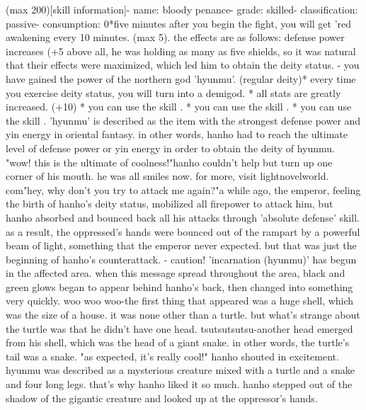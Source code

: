  (max 200)[skill information]- name: bloody penance- grade: skilled- classification: passive- consumption: 0*five minutes after you begin the fight, you will get 'red awakening every 10 minutes.
 (max 5).
 the effects are as follows: defense power increases (+5%
above all, he was holding as many as five shields, so it was natural that their effects were maximized, which led him to obtain the deity status.
- you have gained the power of the northern god 'hyunmu'.
 (regular deity)* every time you exercise deity status, you will turn into a demigod.
 * all stats are greatly increased.
 (+10)
* you can use the skill .
* you can use the skill .
* you can use the skill .
'hyunmu' is described as the item with the strongest defense power and yin energy in oriental fantasy.
 in other words, hanho had to reach the ultimate level of defense power or yin energy in order to obtain the deity of hyunmu.
"wow! this is the ultimate of coolness!"hanho couldn't help but turn up one corner of his mouth.
 he was all smiles now.
 for more, visit lightnovelworld.
c‌om"hey, why don't you try to attack me again?"a while ago, the emperor, feeling the birth of hanho's deity status, mobilized all firepower to attack him, but hanho absorbed and bounced back all his attacks through 'absolute defense' skill.
 as a result, the oppressed's hands were bounced out of the rampart by a powerful beam of light, something that the emperor never expected.
 but that was just the beginning of hanho's counterattack.
- caution! 'incarnation (hyunmu)' has begun in the affected area.
when this message spread throughout the area, black and green glows began to appear behind hanho's back, then changed into something very quickly.
woo woo woo-the first thing that appeared was a huge shell, which was the size of a house.
 it was none other than a turtle.
 but what's strange about the turtle was that he didn't have one head.
tsutsutsutsu-another head emerged from his shell, which was the head of a giant snake.
 in other words, the turtle's tail was a snake.
"as expected, it's really cool!" hanho shouted in excitement.
 hyunmu was described as a mysterious creature mixed with a turtle and a snake and four long legs.
 that's why hanho liked it so much.
 hanho stepped out of the shadow of the gigantic creature and looked up at the oppressor's hands.
